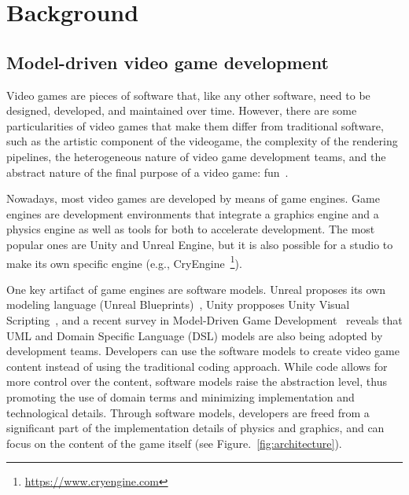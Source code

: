 \section{Background} \label{sec:Background}

\subsection{Model-driven video game development}

Video games are pieces of software that, like any other software, need to be designed, developed, and maintained over time. However, there are some particularities of video games that make them differ from traditional software, such as the artistic component of the videogame, the complexity of the rendering pipelines, the heterogeneous nature of video game development teams, and the abstract nature of the final purpose of a video game: fun~\cite{pascarella2018video, chueca2023consolidation}. 


Nowadays, most video games are developed by means of game engines. Game engines are development environments that integrate a graphics engine and a physics engine as well as tools for both to accelerate development. The most popular ones are Unity and Unreal Engine, but it is also possible for a studio to make its own specific engine (e.g., CryEngine~\footnote{\url{https://www.cryengine.com}}). 

One key artifact of game engines are software models. Unreal proposes its own modeling language (Unreal Blueprints)~\cite{unrealblueprint}, Unity propposes Unity Visual Scripting~\cite{unityscripting}, and a recent survey in Model-Driven Game Development~\cite{zhu2019model} reveals that UML and Domain Specific Language (DSL) models are also being adopted by development teams. Developers can use the software models to create video game content instead of using the traditional coding approach. While code allows for more control over the content, software models raise the abstraction level, thus promoting the use of domain terms and minimizing implementation and technological details. Through software models, developers are freed from a significant part of the implementation details of physics and graphics, and can focus on the content of the game itself (see Figure.~\ref{fig:architecture}).


